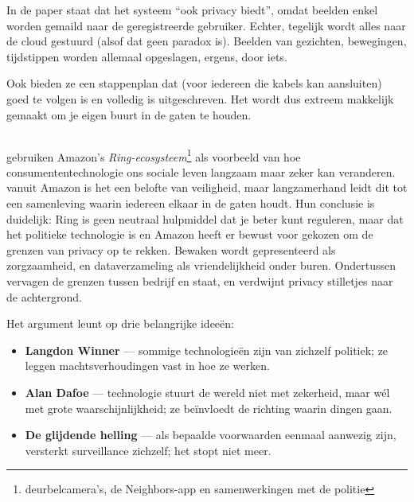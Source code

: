 \documentclass[nonacm,sigconf]{acmart}
\begin{document}
    In de paper staat dat het systeem “ook privacy biedt”, omdat beelden enkel worden gemaild naar de geregistreerde gebruiker.
    Echter, tegelijk wordt alles naar de cloud gestuurd (alsof dat geen paradox is).
    Beelden van gezichten, bewegingen, tijdstippen worden allemaal opgeslagen, ergens, door iets.

    Ook bieden ze een stappenplan dat (voor iedereen die kabels kan aansluiten) goed te volgen is en volledig is uitgeschreven.
    Het wordt dus extreem makkelijk gemaakt om je eigen buurt in de gaten te houden.

    \subsection{}

    \parencite{selinger2022amazon} gebruiken Amazon’s \textit{Ring-ecosysteem}\footnote{deurbelcamera’s, de Neighbors-app en samenwerkingen met de politie} als voorbeeld van hoe consumententechnologie ons sociale leven langzaam maar zeker kan veranderen.
    vanuit Amazon is het een belofte van veiligheid, maar langzamerhand leidt dit tot een samenleving waarin iedereen elkaar in de gaten houdt.
    Hun conclusie is duidelijk: Ring is geen neutraal hulpmiddel dat je beter kunt reguleren, maar dat het politieke technologie is en Amazon heeft er bewust voor gekozen om de grenzen van privacy op te rekken.
    Bewaken wordt gepresenteerd als zorgzaamheid, en dataverzameling als vriendelijkheid onder buren.
    Ondertussen vervagen de grenzen tussen bedrijf en staat, en verdwijnt privacy stilletjes naar de achtergrond.

    \vertspace

    \noindent Het argument leunt op drie belangrijke ideeën:
    \begin{itemize}
        \item \textbf{Langdon Winner} — sommige technologieën zijn van zichzelf politiek; ze leggen machtsverhoudingen vast in hoe ze werken.
        \item \textbf{Alan Dafoe} — technologie stuurt de wereld niet met zekerheid, maar wél met grote waarschijnlijkheid; ze beïnvloedt de richting waarin dingen gaan.
        \item \textbf{De glijdende helling} — als bepaalde voorwaarden eenmaal aanwezig zijn, versterkt surveillance zichzelf; het stopt niet meer.
    \end{itemize}
\end{document}
